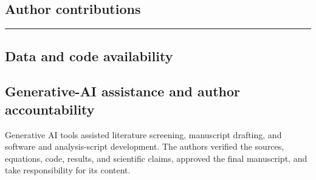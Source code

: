 \documentclass[11pt]{article}
\newcommand{\blankfield}{\par\noindent\rule{\linewidth}{0.3pt}\par\medskip}
\begin{document}
\subsection*{Author contributions}
\blankfield
\subsection*{Data and code availability}

\subsection*{Generative-AI assistance and author accountability}
Generative AI tools assisted literature screening, manuscript drafting, and
software and analysis-script development. The authors verified the sources,
equations, code, results, and scientific claims, approved the final manuscript,
and take responsibility for its content.
\end{document}

